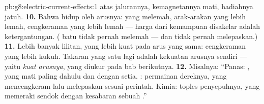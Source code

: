 \begin{solution}{pb:g8:electric-current-effects:1}
atas jalurannya, kemagnetannya mati, hadiahnya jatuh.
\textbf{10.} Bahwa  hidup oleh arusnya:  yang
melemah, arak-arakan yang lebih lemah, cengkeraman yang lebih lemah
--- harga dari kemampuan disakelar adalah ketergantungan. (
batu tidak pernah melemah --- dan tidak pernah melepaskan.)
\textbf{11.} Lebih banyak lilitan,  yang lebih kuat pada arus
yang sama: cengkeraman yang lebih kukuh. Takaran yang satu lagi adalah
kekuatan arusnya sendiri --- yaitu \emph{kuat arusnya}, yang diukur
pada bab berikutnya.
\textbf{12.} Misalnya: ``Panas: , yang mati paling dahulu
dan dengan setia. : permainan dereknya, yang mencengkeram lalu
melepaskan sesuai perintah. Kimia: toples penyepuhnya, yang
memeraki sendok dengan kesabaran sebuah .''
\end{solution}
